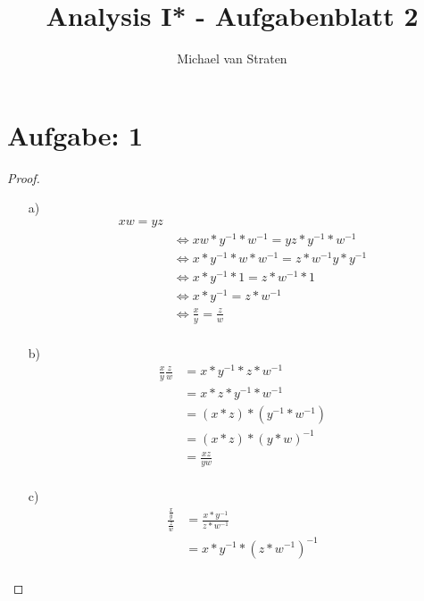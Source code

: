 \documentclass{exam}
\title{Analysis I* - Aufgabenblatt 2}
\author{Michael van Straten}
\begin{document}
\maketitle

\section*{Aufgabe: 1}
\begin{proof}
    \begin{enumerate}
        \item [a)]
              \begin{align*}
                  xw = yz                                \\
                   & \Leftrightarrow
                  xw*y^{-1}*w^{-1} = yz * y^{-1}*w^{-1}  \\
                   & \Leftrightarrow
                  x*y^{-1}*w*w^{-1} = z*w^{-1} y* y^{-1} \\
                   & \Leftrightarrow
                  x*y^{-1}*1 = z*w^{-1} *1               \\
                   & \Leftrightarrow
                  x*y^{-1} = z*w^{-1}                    \\
                   & \Leftrightarrow
                  \frac{x}{y} = \frac{z}{w}              \\
              \end{align*}
        \item [b)]
              \begin{align*}
                  \frac{x}{y} \frac{z}{w} & = x * y^{-1} * z * w^{-1}     \\
                                          & = x * z * y^{-1} * w^{-1}     \\
                                          & = (x * z) * (y^{-1} * w^{-1}) \\
                                          & = (x * z) * {(y * w)}^{-1}    \\
                                          & = \frac{xz}{yw}               \\
              \end{align*}
        \item [c)]
              \begin{align*}
                  \frac{\frac{x}{y}}{\frac{z}{w}} & = \frac{x*y^{-1}}{z * w^{-1}}         \\
                                                  & = x*y^{-1} * {(z * w^{-1})}^{-1}      \\

\end{align*}
\end{enumerate}
\end{proof}
\end{document}
